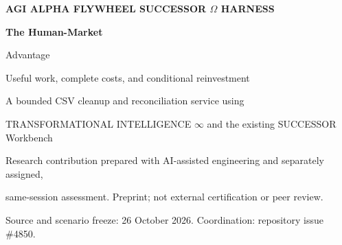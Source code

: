 \documentclass[11pt,letterpaper]{article}
\begin{document}
\thispagestyle{empty}
{\small\bfseries\color{accent} AGI ALPHA FLYWHEEL \hfill SUCCESSOR $\Omega$ HARNESS\par}
\vspace{0.22in}
{\Huge\bfseries The Human-Market\par Advantage\par}
\vspace{0.13in}
{\Large Useful work, complete costs, and conditional reinvestment\par}
\vspace{0.14in}
{\large A bounded CSV cleanup and reconciliation service using\par
TRANSFORMATIONAL INTELLIGENCE $\infty$ and the existing SUCCESSOR Workbench\par}
\vspace{0.15in}
{\small Research contribution prepared with AI-assisted engineering and separately assigned,\par
same-session assessment. Preprint; not external certification or peer review.\par
Source and scenario freeze: 26 October 2026. Coordination: repository issue \#4850.\par}
\vspace{0.2in}
\end{document}
